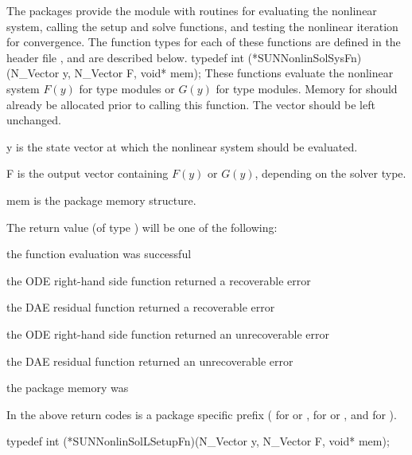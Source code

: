 The {\sundials} packages provide the {\sunnonlinsol} module with
routines for evaluating the nonlinear system, calling the {\sunlinsol}
setup and solve functions, and testing the nonlinear iteration for
convergence. The function types for each of these functions are
defined in the header file ,
and are described below. 
{
  typedef int (*SUNNonlinSolSysFn)(N\_Vector y, N\_Vector F, void* mem);
}
{
  These functions evaluate the nonlinear system $F(y)$
  for  type modules or $G(y)$
  for  type modules. Memory
  for  should already be allocated prior to calling this
  function. The vector  should be left unchanged.
}
{
  \begin{args}[mem]
  \item[y]
    is the state vector at which the nonlinear system should be evaluated.
  \item[F]
    is the output vector containing $F(y)$ or $G(y)$, depending on the
    solver type.
  \item[mem]
    is the {\sundials} package memory structure.
  \end{args}
}
{
  The return value  (of type ) will be one of the
  following:
  \begin{args}
  \item[\id{*\_SUCCESS}]
    the function evaluation was successful
  \item[\id{*\_RHSFUNC\_RECVR}]
    the ODE right-hand side function returned a recoverable error
  \item[\id{*\_RES\_RECVR}]
    the DAE residual function returned a recoverable error
  \item[\id{*\_RHSFUNC\_FAIL}]
    the ODE right-hand side function returned an unrecoverable error
  \item[\id{*\_RES\_FAIL}]
    the DAE residual function returned an unrecoverable error
  \item[\id{*\_MEM\_NULL}]
    the {\sundials} package memory was 
  \end{args}
  In the above return codes \id{*} is a {\sundials} package specific
  prefix ( for {\cvode} or {\cvodes},  for {\ida} or
  {\idas}, and  for {\arkode}).
}
{}
{
  typedef int (*SUNNonlinSolLSetupFn)(N\_Vector y, N\_Vector F, void* mem);
}

